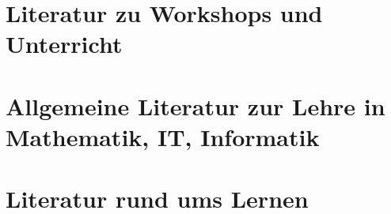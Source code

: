 \documentclass[a4paper,openany,twoside,titlepage,10pt,headsepline]{scrbook}
\begin{document}
\section{Literatur zu Workshops und Unterricht}
\cite{moderationstechniken, visualisieren-praesentieren-moderieren, workshop-buch, treibhaeuser-der-zukunft}

\section{Allgemeine Literatur zur Lehre in Mathematik, IT, Informatik}
\cite{teaching-engineering, red-pen, it-trainer}

\section{Literatur rund ums Lernen}
\cite{denken-lernen-vergessen, lernen-zu-lernen}




\end{document}
